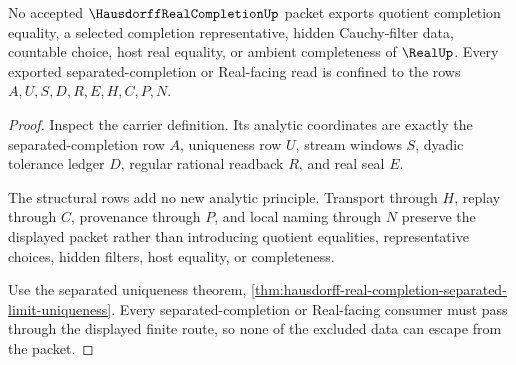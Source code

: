 \begin{theorem}
\label{thm:hausdorff-real-completion-nonescape}
No accepted $\HausdorffRealCompletionUp$ packet exports quotient completion equality, a selected completion representative, hidden Cauchy-filter data, countable choice, host real equality, or ambient completeness of $\RealUp$. Every exported separated-completion or Real-facing read is confined to the rows $A,U,S,D,R,E,H,C,P,N$.
\end{theorem}
\begin{proof}
Inspect the carrier definition. Its analytic coordinates are exactly the separated-completion row $A$, uniqueness row $U$, stream windows $S$, dyadic tolerance ledger $D$, regular rational readback $R$, and real seal $E$.

The structural rows add no new analytic principle. Transport through $H$, replay through $C$, provenance through $P$, and local naming through $N$ preserve the displayed packet rather than introducing quotient equalities, representative choices, hidden filters, host equality, or completeness.

Use the separated uniqueness theorem, \autoref{thm:hausdorff-real-completion-separated-limit-uniqueness}. Every separated-completion or Real-facing consumer must pass through the displayed finite route, so none of the excluded data can escape from the packet.
\end{proof}





